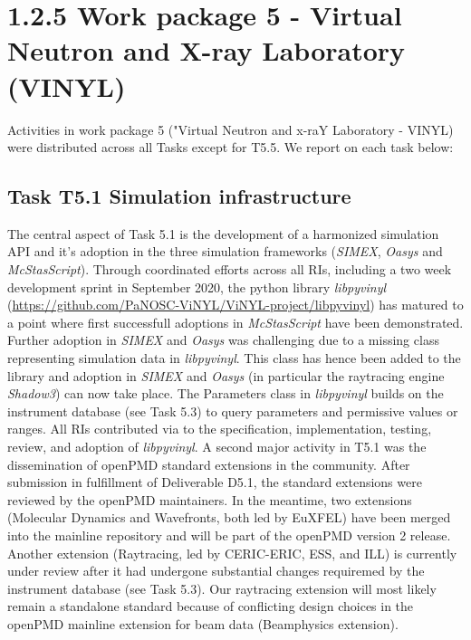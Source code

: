 \documentclass[11pt]{article}
\author{Carsten Fortmann-Grote}
\date{\today}
\title{}
\begin{document}
\tableofcontents

\section{1.2.5 Work package 5 - Virtual Neutron and X-ray Laboratory (VINYL)}
\label{sec:org6265284}


Activities in work package 5 ("Virtual Neutron and x-raY Laboratory - VINYL)
were distributed across all Tasks except for T5.5. We report on each task below:

\subsection{Task T5.1 Simulation infrastructure}
\label{sec:orgc3c7baf}
The central aspect of Task 5.1 is the development of a harmonized simulation API
and it's adoption in the three simulation frameworks (\emph{SIMEX}, \emph{Oasys} and
\emph{McStasScript}). Through coordinated efforts across all RIs, including a two
week development sprint in September 2020, the python library \emph{libpyvinyl}
(\href{https://github.com/PaNOSC-ViNYL/ViNYL-project/libpyvinyl}{https://github.com/PaNOSC-ViNYL/ViNYL-project/libpyvinyl}) has matured to a
point where first successfull adoptions in \emph{McStasScript} have been demonstrated.
Further adoption in \emph{SIMEX} and \emph{Oasys} was challenging due to a missing class
representing simulation data in \emph{libpyvinyl}. This class has hence been added to
the library and adoption in \emph{SIMEX} and \emph{Oasys} (in particular the raytracing engine
\emph{Shadow3}) can now take place. The Parameters class in \emph{libpyvinyl} builds on the
instrument database (see Task 5.3) to query parameters and permissive values or
ranges. All RIs contributed via to the
specification, implementation, testing, review, and adoption of \emph{libpyvinyl}. A
second major activity in T5.1 was the dissemination of openPMD standard
extensions in the community. After submission in fulfillment of Deliverable
D5.1, the standard extensions were reviewed by the openPMD maintainers. In the
meantime, two extensions (Molecular Dynamics and Wavefronts, both led by EuXFEL)
have been merged into the mainline repository and will be part of the openPMD
version 2 release. Another extension (Raytracing, led by CERIC-ERIC, ESS, and
ILL) is currently under review after it had undergone substantial changes
requiremed by the instrument database (see Task 5.3). Our raytracing extension
will most likely remain a standalone standard because of conflicting design
choices in the openPMD mainline extension for beam data (Beamphysics extension).
\end{document}
